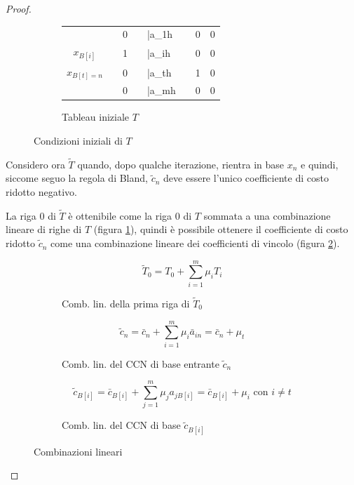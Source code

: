 \documentclass[\main/main.tex]{subfiles}
\begin{document}
\begin{proof}
\begin{figure}
\begin{subfigure}{0.49\textwidth}
\begin{tabular}{c|LcLLLc|L}
                       &  & 0          &  & \bar{a}_{1h} &  & 0     & 0 \\


          $x_{B[i]}$   &  & 1          &  & \bar{a}_{ih} &  & 0     & 0 \\


          $x_{B[t]=n}$ &  & 0          &  & \bar{a}_{th} &  & 1     & 0 \\


                       &  & 0          &  & \bar{a}_{mh} &  & 0     & 0 \\
        \end{tabular}
        \caption{Tableau iniziale $T$}
    \end{subfigure}
    \caption{Condizioni iniziali di $T$}
  \end{figure}


  Considero ora $\tilde{T}$ quando, dopo qualche iterazione, rientra in base $x_n$ e quindi, siccome seguo la regola di Bland, $\tilde{c}_n$ deve essere l'unico coefficiente di costo ridotto negativo.

  La riga $0$ di $\tilde{T}$ è ottenibile come la riga $0$ di $T$ sommata a una combinazione lineare di righe di $T$ (figura \ref{T_linear_combination}), quindi è possibile ottenere il coefficiente di costo ridotto $\tilde{c}_n$ come una combinazione lineare dei coefficienti di vincolo (figura \ref{ccr_n_linear_combination}).

  \begin{figure}
    \begin{subfigure}{0.31\textwidth}
      \[
        \tilde{T}_0 = T_0 + \sum_{i=1}^m \mu_i T_i
      \]
      \caption{Comb. lin. della prima riga di $\tilde{T}_0$}
      \label{T_linear_combination}
    \end{subfigure}
    \begin{subfigure}{0.31\textwidth}
      \[
        \tilde{c}_n = \bar{c}_n + \sum_{i=1}^m \mu_i \bar{a}_{in} = \bar{c}_n + \mu_t
      \]
      \caption{Comb. lin. del CCN di base entrante $\tilde{c}_n$}
      \label{ccr_n_linear_combination}
    \end{subfigure}
    \begin{subfigure}{0.31\textwidth}
      \[
        \tilde{c}_{B[i]} = \bar{c}_{B[i]} + \sum_{j=1}^m \mu_j a_{jB[i]} = \bar{c}_{B[i]} + \mu_i  \text{ con } i \neq t
      \]
      \caption{Comb. lin. del CCN di base $\tilde{c}_{B[i]}$}
      \label{ccr_i_linear_combination}
    \end{subfigure}
    \caption{Combinazioni lineari}
  \end{figure}


\end{proof}
\end{document}
